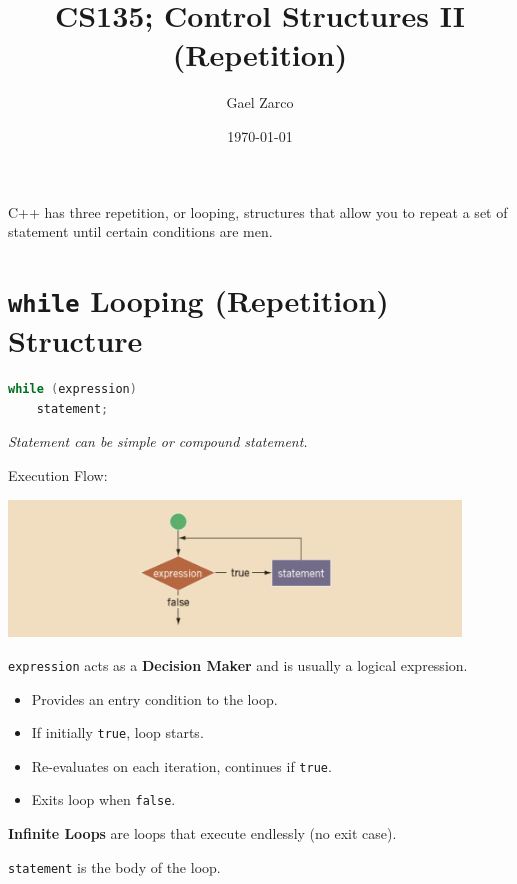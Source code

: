 \documentclass{article}
\title{CS135; Control Structures II (Repetition)}
\author{Gael Zarco}
\date{\today}
\begin{document}
\maketitle

C++ has three repetition, or looping, structures that allow you to repeat a set of statement until certain conditions are men.

\section{\texttt{while} Looping (Repetition) Structure}

\begin{lstlisting}[language=C++, caption={\texttt{while} Loop Syntax}]
while (expression)
	statement;
\end{lstlisting}
\textit{Statement can be simple or compound statement.}

\vspace{8pt}
Execution Flow:
\begin{center}
    \includegraphics[width=0.9\textwidth]{while-exec-flow.png}
\end{center}

\vspace{8pt}
\texttt{expression} acts as a \textbf{Decision Maker} and is usually a logical expression.
\begin{itemize}
    \item Provides an entry condition to the loop.
    \item If initially \texttt{true}, loop starts.
    \item Re-evaluates on each iteration, continues if \texttt{true}.
    \item Exits loop when \texttt{false}.
\end{itemize}

\textbf{Infinite Loops} are loops that execute endlessly (no exit case).

\vspace{8pt}
\texttt{statement} is the body of the loop.
\end{document}
